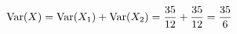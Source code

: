 \documentclass[preview]{standalone}
\begin{document}
\begin{align*}
\special{dvisvgm:raw <g id='unique000'>}\operatorname{Var}(X)=\operatorname{Var}(X_1)+\operatorname{Var}(X_2)=\dfrac{35}{12}+\dfrac{35}{12}=\dfrac{35}{6}\special{dvisvgm:raw </g>}
\end{align*}
\end{document}
